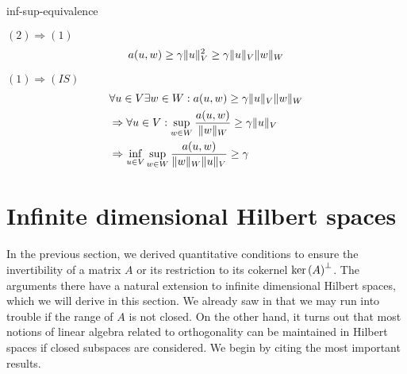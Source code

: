 \begin{Problem}{inf-sup-equivalence}
\begin{solution}
  $(2)\Rightarrow(1)$ \\
  \begin{align}
  a(u,w) \ge \gamma \lVert u\rVert_V^2 \ge \gamma \lVert u\rVert_V \lVert w\rVert_W
  \end{align}

  $(1)\Rightarrow(IS)$ \\
  \begin{align}
  &\forall u\in V \exists w\in W: a(u,w)\ge \gamma \lVert u\rVert_V\lVert w\rVert_W\\
  &\Rightarrow \forall u\in V: \sup_{w\in W} \frac{a(u,w)}{\lVert w\rVert_W}\ge \gamma \lVert u\rVert_V\\
  &\Rightarrow \inf_{u\in V}\sup_{w\in W} \frac{a(u,w)}{\lVert w\rVert_W\lVert u\rVert_V}\ge \gamma
  \end{align}
\end{solution}
\end{Problem}


\section{Infinite dimensional Hilbert spaces}

\begin{intro}
  In the previous section, we derived quantitative conditions to
  ensure the invertibility of a matrix $A$ or its restriction to its
  cokernel $\operatorname{ker}\left(A\right)^\perp$. The arguments there have a natural
  extension to infinite dimensional Hilbert spaces, which we will
  derive in this section. We already saw in
   that we may run into trouble
  if the range of $A$ is not closed. On the other hand, it turns out
  that most notions of linear algebra related to orthogonality can be
  maintained in Hilbert spaces if closed subspaces are considered.
  We begin by citing the most important results.
\end{intro}

